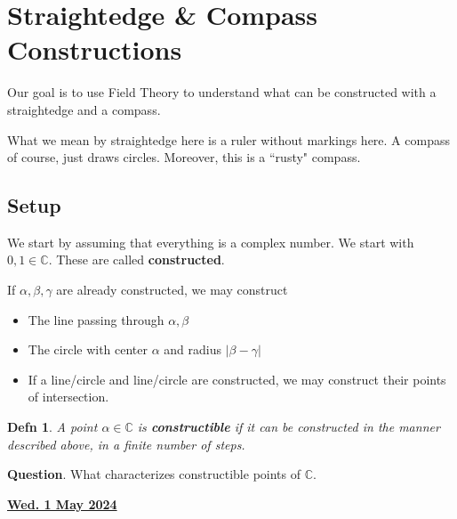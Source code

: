 \documentclass[12pt]{article}
\renewcommand{\date}[1]{\underline{\bf #1}}
\def\C{{\mathbb C}}
\newtheorem{definition}{Defn}
\theoremstyle{remark}
\theoremstyle{remark}
\theoremstyle{remark}
\theoremstyle{remark}
\theoremstyle{remark}
\begin{document}
\section{Straightedge \& Compass Constructions}

Our goal is to use Field Theory to understand what can be constructed with a
straightedge and a compass.

What we mean by straightedge here is a ruler without markings here. A compass of
course, just draws circles. Moreover, this is a ``rusty" compass.

\subsection{Setup}

We start by assuming that everything is a complex number. We start with $0, 1
\in \C$. These are called {\bf constructed}.

If $\alpha, \beta, \gamma$ are already constructed, we may construct
\begin{itemize}
  \item The line passing through $\alpha, \beta$
  \item The circle with center $\alpha$ and radius $|\beta - \gamma|$
  \item If a line/circle and line/circle are constructed, we may construct their
    points of intersection.
\end{itemize}

\begin{definition}
  A point $\alpha \in \C$ is {\bf constructible} if it can be constructed in the
  manner described above, in a finite number of steps.
\end{definition}

{\bf Question}. What characterizes constructible points of $\C$.

\date{Wed. 1 May 2024}
\end{document}
